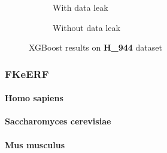         \begin{figure}[H]
            \centering
            \begin{subfigure}{0.47\textwidth}
              \centering
              \resizebox{\textwidth}{!}{}
              \captionsetup{justification=centering}
              \caption{With data leak}
            \end{subfigure}%
            \hspace{0.05\textwidth}
            \begin{subfigure}{0.47\textwidth}
              \centering
              \resizebox{\textwidth}{!}{}
              \captionsetup{justification=centering}
              \caption{Without data leak}
            \end{subfigure}
            \caption{XGBoost results on \textbf{H\_944} dataset}\label{fig:pseu-st_m944}
        \end{figure}

    \subsubsection{FKeERF \cite{chen_fuzzy_2024}}

      \paragraph{Homo sapiens}

      \paragraph{Saccharomyces cerevisiae}

      \paragraph{Mus musculus}

%
